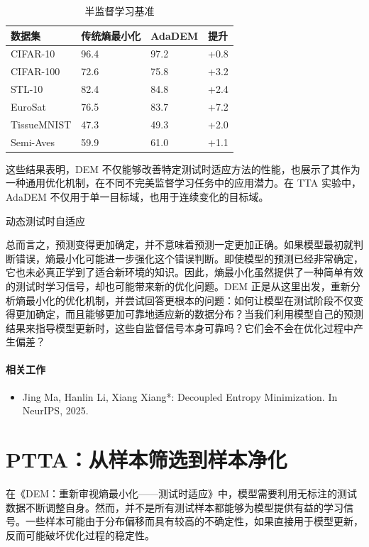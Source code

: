 \begin{table}[H]\centering
\caption*{半监督学习基准}
\begin{tabular}{llll}\toprule
\textbf{数据集} & \textbf{传统熵最小化} & \textbf{AdaDEM} & \textbf{提升} \\ \midrule
CIFAR-10 & 96.4 & 97.2 & +0.8 \\
CIFAR-100 & 72.6 & 75.8 & +3.2 \\
STL-10 & 82.4 & 84.8 & +2.4 \\
EuroSat & 76.5 & 83.7 & +7.2 \\
TissueMNIST & 47.3 & 49.3 & +2.0 \\
Semi-Aves & 59.9 & 61.0 & +1.1 \\
\bottomrule\end{tabular}
\end{table}

这些结果表明，DEM 不仅能够改善特定测试时适应方法的性能，也展示了其作为一种通用优化机制，在不同不完美监督学习任务中的应用潜力。在 TTA 实验中，AdaDEM 不仅用于单一目标域，也用于连续变化的目标域。

动态测试时自适应

总而言之，预测变得更加确定，并不意味着预测一定更加正确。如果模型最初就判断错误，熵最小化可能进一步强化这个错误判断。即使模型的预测已经非常确定，它也未必真正学到了适合新环境的知识。因此，熵最小化虽然提供了一种简单有效的测试时学习信号，却也可能带来新的优化问题。DEM 正是从这里出发，重新分析熵最小化的优化机制，并尝试回答更根本的问题：如何让模型在测试阶段不仅变得更加确定，而且能够更加可靠地适应新的数据分布？当我们利用模型自己的预测结果来指导模型更新时，这些自监督信号本身可靠吗？它们会不会在优化过程中产生偏差？

\paragraph{相关工作}

\begin{itemize}
  \item Jing Ma, Hanlin Li, Xiang Xiang*: Decoupled Entropy Minimization. In NeurIPS, 2025.
\end{itemize}

\section{PTTA：从样本筛选到样本净化}

在《DEM：重新审视熵最小化——测试时适应》中，模型需要利用无标注的测试数据不断调整自身。然而，并不是所有测试样本都能够为模型提供有益的学习信号。一些样本可能由于分布偏移而具有较高的不确定性，如果直接用于模型更新，反而可能破坏优化过程的稳定性。

